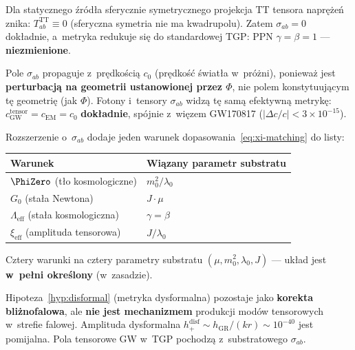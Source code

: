 \begin{remark}%
\label{rem:sigma-ppn}
Dla statycznego \'zr\'od\l{}a sferycznie symetrycznego
projekcja TT tensora napr\k{e}\.ze\'n znika:
$T_{ab}^{\mathrm{TT}} \equiv 0$ (sferyczna symetria nie ma kwadrupolu).
Zatem $\sigma_{ab} = 0$ dok\l{}adnie, a~metryka
redukuje si\k{e} do standardowej TGP:
PPN $\gamma = \beta = 1$ --- \textbf{niezmienione}.
\end{remark}

\begin{remark}%
\label{rem:cGW-tensor}
Pole $\sigma_{ab}$ propaguje z~pr\k{e}dko\'sci\k{a} $c_0$
(pr\k{e}dko\'s\'c \'swiat\l{}a w~pr\'o\.zni), poniewa\.z
jest \textbf{perturbacj\k{a} na geometrii ustanowionej przez $\Phi$},
nie polem konstytuuj\k{a}cym t\k{e} geometri\k{e} (jak $\Phi$).
Fotony i~tensory $\sigma_{ab}$ widz\k{a} t\k{e} sam\k{a}
efektywn\k{a} metryk\k{e}:
$c_{\mathrm{GW}}^{\mathrm{tensor}} = c_{\mathrm{EM}} = c_0$
\textbf{dok\l{}adnie}, sp\'ojnie z~wi\k{e}zem GW170817
($|\Delta c/c| < 3 \times 10^{-15}$).
\end{remark}

\begin{remark}\label{rem:param-counting}
Rozszerzenie o~$\sigma_{ab}$ dodaje jeden warunek
dopasowania~\eqref{eq:xi-matching} do listy:
\begin{center}\small
\begin{tabular}{@{}ll@{}}
\toprule
\textbf{Warunek} & \textbf{Wi\k{a}zany parametr substratu} \\
\midrule
$\PhiZero$ (t\l{}o kosmologiczne) & $m_0^2/\lambda_0$ \\
$G_0$ (sta\l{}a Newtona) & $J\cdot\mu$ \\
$\Lambda_{\mathrm{eff}}$ (sta\l{}a kosmologiczna) & $\gamma = \beta$ \\
$\xi_{\mathrm{eff}}$ (amplituda tensorowa) & $J/\lambda_0$ \\
\bottomrule
\end{tabular}
\end{center}
Cztery warunki na cztery parametry substratu
$(\mu, m_0^2, \lambda_0, J)$ --- uk\l{}ad jest
\textbf{w~pe\l{}ni okre\'slony} (w~zasadzie).
\end{remark}

\begin{remark}\label{rem:disformal-status}
Hipoteza~\ref{hyp:disformal} (metryka dysformalna)
pozostaje jako \textbf{korekta bli\.znofalowa},
ale \textbf{nie jest mechanizmem} produkcji mod\'ow
tensorowych w~strefie falowej.
Amplituda dysformalna
$h^{\mathrm{disf}}_+ \sim h_{\mathrm{GR}}/(kr)
\sim 10^{-40}$ jest pomijalna.
Pola tensorowe GW w~TGP pochodz\k{a}
z~substratowego $\sigma_{ab}$.
\end{remark}

